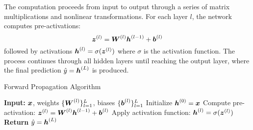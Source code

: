 The computation proceeds from input to output through a series of matrix multiplications and nonlinear transformations. For each layer $l$, the network computes pre-activations:
\begin{equation}
\boldsymbol{z}^{(l)} = \boldsymbol{W}^{(l)} \boldsymbol{h}^{(l-1)} + \boldsymbol{b}^{(l)}
\end{equation}
followed by activations $\boldsymbol{h}^{(l)} = \sigma(\boldsymbol{z}^{(l)})$ where $\sigma$ is the activation function. The process continues through all hidden layers until reaching the output layer, where the final prediction $\hat{y} = \boldsymbol{h}^{(L)}$ is produced.

\begin{algorithm}[htbp]
\caption{Forward Propagation Algorithm}
\label{alg:forward-propagation}
\begin{algorithmic}[1]
\State \textbf{Input:} $\boldsymbol{x}$, weights $\{\boldsymbol{W}^{(l)}\}_{l=1}^{L}$, biases $\{\boldsymbol{b}^{(l)}\}_{l=1}^{L}$
\State Initialize $\boldsymbol{h}^{(0)} = \boldsymbol{x}$
    \State Compute pre-activation: $\boldsymbol{z}^{(l)} = \boldsymbol{W}^{(l)} \boldsymbol{h}^{(l-1)} + \boldsymbol{b}^{(l)}$
    \State Apply activation function: $\boldsymbol{h}^{(l)} = \sigma(\boldsymbol{z}^{(l)})$
\EndFor
\State \textbf{Return} $\hat{y} = \boldsymbol{h}^{(L)}$
\end{algorithmic}
\end{algorithm}

